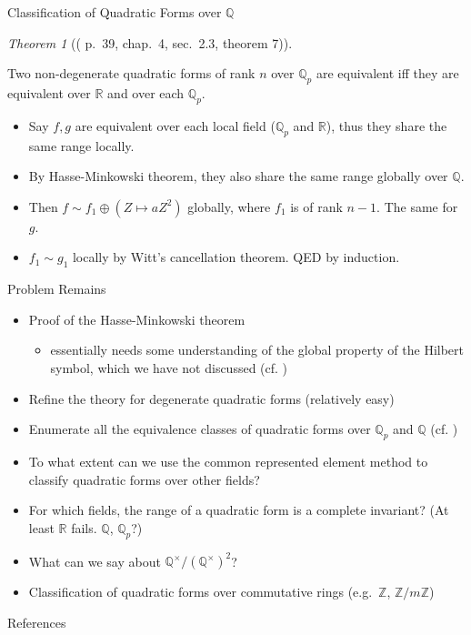 \documentclass[fontset=fandol,envcountsect]{ctexbeamer}
\def\transreferences{参考文献}
\def\transreferences{References}
\providecommand{\tightlist}{%
  \setlength{\itemsep}{0pt}\setlength{\parskip}{0pt}}\usepackage{longtable,booktabs,array}
\theoremstyle{theorem}
\newtheorem{theorem}{定理}
\theoremstyle{example}
\theoremstyle{remark}
\theoremstyle{theorem}
\newtheorem{theorem}{Theorem}
\theoremstyle{example}
\theoremstyle{remark}
\begin{document}
\begin{frame}{Classification of Quadratic Forms over \(\mathbb Q\)}
\label{classification-of-quadratic-forms-over-mathbb-q}
\begin{theorem}[(\autocite{serre_course_1973} p.~39, chap.~4, sec.~2.3,
theorem
7)]\protect\hypertarget{thm-qp-classification}{}\label{thm-qp-classification}

Two non-degenerate quadratic forms of rank \(n\) over \(\mathbb Q_p\)
are equivalent iff they are equivalent over \(\mathbb R\) and over each
\(\mathbb Q_p\).

\end{theorem}

\begin{itemize}
\item
  Say \(f,g\) are equivalent over each local field (\(\mathbb Q_p\) and
  \(\mathbb R\)), thus they share the same range locally.
\item
  By Hasse-Minkowski theorem, they also share the same range globally
  over \(\mathbb Q\).
\item
  Then \(f \sim f_1 \oplus (Z \mapsto a Z^2)\) globally, where \(f_1\)
  is of rank \(n-1\). The same for \(g\).
\item
  \(f_1 \sim g_1\) locally by Witt's cancellation theorem. QED by
  induction.
\end{itemize}
\end{frame}

\begin{frame}{Problem Remains}
\label{problem-remains}
\begin{itemize}
\item
  Proof of the Hasse-Minkowski theorem

  \begin{itemize}
  \tightlist
  \item
    essentially needs some understanding of the global property of the
    Hilbert symbol, which we have not discussed (cf.
    \autocite{serre_course_1973})
  \end{itemize}
\item
  Refine the theory for degenerate quadratic forms (relatively easy)
\item
  Enumerate all the equivalence classes of quadratic forms over
  \(\mathbb Q_p\) and \(\mathbb Q\) (cf. \autocite{serre_course_1973})
\item
  To what extent can we use the common represented element method to
  classify quadratic forms over other fields?
\item
  For which fields, the range of a quadratic form is a complete
  invariant? (At least \(\mathbb R\) fails. \(\mathbb Q\),
  \(\mathbb Q_p\)?)
\item
  What can we say about \(\mathbb Q^\times / (\mathbb Q^\times)^2\)?
\item
  Classification of quadratic forms over commutative rings
  (e.g.~\(\mathbb Z\), \(\mathbb Z / m \mathbb Z\))
\end{itemize}
\end{frame}

\begin{frame}[allowframebreaks]{\transreferences}
    \printbibliography[heading=none]
\end{frame}
\end{document}
